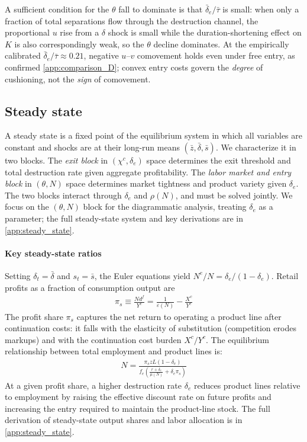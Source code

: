 \documentclass[authoryear, review, 12pt]{elsarticle}
\begin{document}
A sufficient condition for the $\theta$ fall to dominate is that
$\bar\delta_e/\bar\tau$ is small: when only a fraction of total
separations flow through the destruction channel, the proportional
$u$ rise from a $\delta$ shock is small while the duration-shortening
effect on $K$ is also correspondingly weak, so the $\theta$ decline
dominates.
At the empirically calibrated $\bar\delta_e/\bar\tau\approx 0.21$,
negative $u$--$v$ comovement holds even under free entry, as confirmed
\ref{app:comparison_D}; convex entry costs govern the
\emph{degree} of cushioning, not the \emph{sign} of comovement.

\subsection{Steady state}\label{sec:steady_state}

A steady state is a fixed point of the equilibrium system 
in which all variables are constant and shocks are at their 
long-run means $(\bar{z},\bar{\delta},\bar{s})$. We 
characterize it in two blocks. The \emph{exit block} in 
$(\chi^c, \delta_e)$ space determines the exit threshold 
and total destruction rate given aggregate profitability. 
The \emph{labor market and entry block} in $(\theta, N)$ 
space determines market tightness and product variety given 
$\delta_e$. The two blocks interact through $\delta_e$ and 
$\rho(N)$, and must be solved jointly. We focus on the 
$(\theta, N)$ block for the diagrammatic analysis, treating 
$\delta_e$ as a parameter; the full steady-state system 
and key derivations are in 
\ref{app:steady_state}.

\paragraph{Key steady-state ratios}
Setting $\delta_t = \bar{\delta}$ and $s_t = \bar{s}$, the 
Euler equations yield $N^e/N = \delta_e/(1-\delta_e)$. 
Retail profits as a fraction of consumption output are
\begin{align}\label{eq:profit_share}
	\pi_s \equiv \frac{Nd^f}{Y^c} 
	= \frac{1}{\varepsilon(N)} - \frac{X^c}{Y^c}
\end{align}
The profit share $\pi_s$ captures the net return to 
operating a product line after continuation costs: it 
falls with the elasticity of substitution (competition 
erodes markups) and with the continuation cost burden 
$X^c/Y^c$. The equilibrium relationship between total 
employment and product lines is:
\begin{align}\label{eq:labor_N}
	N = \frac{\pi_s z L (1-\delta_e)}
	{f_e\left(\frac{r+\delta_e}{\mu(N)}
		+\delta_e\pi_s\right)}
\end{align}
At a given profit share, a higher destruction rate 
$\delta_e$ reduces product lines relative to employment 
by raising the effective discount rate on future profits 
and increasing the entry required to maintain the 
product-line stock. The full derivation of steady-state 
output shares and labor allocation is in 
\ref{app:steady_state}.
\end{document}
